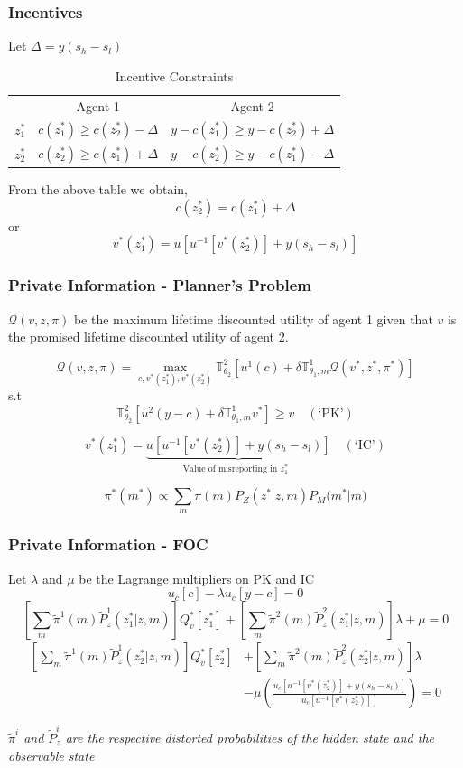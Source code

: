 \documentclass{beamer}
\begin{document}
\begin{frame}
\frametitle{Incentives}
Let $\Delta=y(s_h-s_l)$ 
\begin{table}[h]
  \centering
  \begin{tabular}[h]{l c c}
    
& Agent 1 & Agent 2 \\
$z^*_1$ & $c(z^*_1)\geq c(z^*_2)-\Delta$ & $y-c(z^*_1)\geq y-c(z^*_2)+\Delta$  \\
$z^*_2$ & $c(z^*_2)\geq c(z^*_1)+\Delta$ & $y-c(z^*_2)\geq y-c(z^*_1)-\Delta$  \\
 
  \end{tabular}
  \caption{Incentive Constraints}
  
\end{table}


From the above table we obtain,
\[c(z^*_2)=c(z^*_1)+\Delta\]
or 
\[v^*(z^*_1) = u[u^{-1} \left[v^*(z^*_2)\right] +
  y(s_h-s_l)] \]


\end{frame}


\begin{frame}
\frametitle{Private Information - Planner's Problem}


$\mathcal{Q}(v,z,\pi)$ be the maximum lifetime discounted utility of agent 1 given that $v$ is the promised lifetime discounted utility of agent 2.

\[\mathcal{Q}(v,z,\pi)=\max_{c,v^*(z^*_1),v^*(z^*_2)  } \mathbb{T}_{\theta_2}^{2}\left[u^1(c)+\delta \mathbb{T}_{\theta_1,m}^{1} \mathcal{Q}(v^*,z^*,\pi^*)\right]\]
s.t
\[\mathbb{T}_{\theta_2}^2\left[u^2(y-c)+\delta
  \mathbb{T}_{\theta_1,m}^{1} v^*\right]\geq v \quad (\text{`PK'})\] 

\[v^*(z^*_1) = \underbrace{u[u^{-1} \left[v^*(z^*_2)\right] +
  y(s_h-s_l)]}_{\text{Value of misreporting in $z^*_1$ }}  \quad (\text{`IC'})\]

\[\pi^{*}(m^*)\propto \sum_{m}{\pi(m) P_Z(z^*|z,m)P_M(m^*}|m)\]
\end{frame}



\begin{frame}
\frametitle{Private Information - FOC}
Let $\lambda$ and $\mu$ be the Lagrange multipliers on PK and IC
\[u_c[c]-\lambda u_c[y-c]=0\]
\[\left[\sum_{m}{\tilde{\pi}^1(m)\tilde{P}^1_z(z^*_1 | z,m)}\right]
Q^*_v [z^*_1] +\left[\sum_{m}{\tilde{\pi}^2(m)\tilde{P}^2_z(z^*_1 |
    z,m)}\right]  \lambda  + \mu =0\]
\begin{align*}
\left[\sum_{m}{\tilde{\pi}^1(m)\tilde{P}^1_z(z^*_2 | z,m)}\right]
Q^*_v [z^*_2] &+ \left[\sum_{m}{\tilde{\pi}^2(m)\tilde{P}^2_z(z^*_2 |
    z,m)}\right]  \lambda\\
& -\mu\left( \frac{u_c[u^{-1} \left[v^*(z^*_2)\right]+ 
    y(s_h-s_l)]}{u_c[u^{-1} \left[v^*(z^*_2)\right]]}\right)=0
\end{align*}

\emph{$\tilde{\pi}^i $ and $\tilde {P}^i_z$ are the respective
  distorted probabilities of the hidden state and the observable state}
\end{frame}
\end{document}
